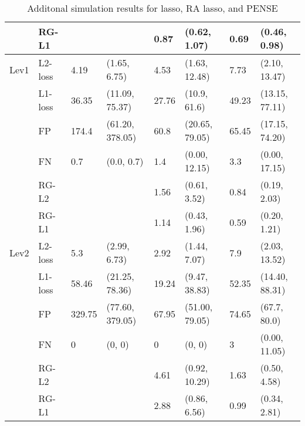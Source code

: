 \begin{table}[]
\begin{tabular}{llllllll}
       & RG-L1   &        &               & 0.87     & (0.62, 1.07)     & 0.69  & (0.46, 0.98)     \\ \hline
Lev1   & L2-loss & 4.19   & (1.65, 6.75)     & 4.53     & (1.63, 12.48)    & 7.73  & (2.10, 13.47)    \\
       & L1-loss & 36.35  & (11.09, 75.37)   & 27.76    & (10.9, 61.6)     & 49.23 & (13.15, 77.11)   \\
       & FP      & 174.4  & (61.20, 378.05)  & 60.8     & (20.65, 79.05)   & 65.45 & (17.15, 74.20)   \\
       & FN      & 0.7    & (0.0, 0.7)       & 1.4      & (0.00, 12.15)    & 3.3   & (0.00, 17.15)    \\
       & RG-L2   &        &               & 1.56     & (0.61, 3.52)     & 0.84  & (0.19, 2.03)     \\
       & RG-L1   &        &               & 1.14     & (0.43, 1.96)     & 0.59  & (0.20, 1.21)     \\ \hline
Lev2   & L2-loss & 5.3    & (2.99, 6.73)     & 2.92     & (1.44, 7.07)     & 7.9   & (2.03, 13.52)    \\
       & L1-loss & 58.46  & (21.25, 78.36)   & 19.24    & (9.47, 38.83)    & 52.35 & (14.40, 88.31)   \\
       & FP      & 329.75 & (77.60, 379.05)  & 67.95    & (51.00, 79.05)   & 74.65 & (67.7, 80.0)     \\
       & FN      & 0      & (0, 0)           & 0        & (0, 0)           & 3     & (0.00, 11.05)    \\
       & RG-L2   &        &               & 4.61     & (0.92, 10.29)    & 1.63  & (0.50, 4.58)     \\
       & RG-L1   &        &               & 2.88     & (0.86, 6.56)     & 0.99  & (0.34, 2.81)    
\end{tabular}
\caption{Additonal simulation results for lasso, RA lasso, and PENSE}
\end{table}